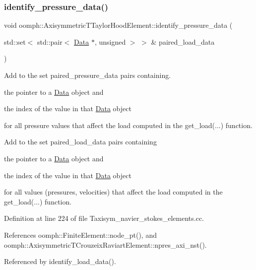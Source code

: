 \subsubsection{\texorpdfstring{identify\+\_\+pressure\+\_\+data()}{identify\_pressure\_data()}}
{\footnotesize\ttfamily void oomph\+::\+Axisymmetric\+T\+Taylor\+Hood\+Element\+::identify\+\_\+pressure\+\_\+data (\begin{DoxyParamCaption}\item[{std\+::set$<$ std\+::pair$<$ \hyperlink{classoomph_1_1Data}{Data} $\ast$, unsigned $>$ $>$ \&}]{paired\+\_\+load\+\_\+data }\end{DoxyParamCaption})}



Add to the set {\ttfamily paired\+\_\+pressure\+\_\+data} pairs containing. 


\begin{DoxyItemize}
\item the pointer to a \hyperlink{classoomph_1_1Data}{Data} object and
\item the index of the value in that \hyperlink{classoomph_1_1Data}{Data} object
\end{DoxyItemize}for all pressure values that affect the load computed in the {\ttfamily get\+\_\+load}(...) function.

Add to the set {\ttfamily paired\+\_\+load\+\_\+data} pairs containing
\begin{DoxyItemize}
\item the pointer to a \hyperlink{classoomph_1_1Data}{Data} object and
\item the index of the value in that \hyperlink{classoomph_1_1Data}{Data} object
\end{DoxyItemize}for all values (pressures, velocities) that affect the load computed in the {\ttfamily get\+\_\+load}(...) function. 

Definition at line 224 of file Taxisym\+\_\+navier\+\_\+stokes\+\_\+elements.\+cc.



References oomph\+::\+Finite\+Element\+::node\+\_\+pt(), and oomph\+::\+Axisymmetric\+T\+Crouzeix\+Raviart\+Element\+::npres\+\_\+axi\+\_\+nst().



Referenced by identify\+\_\+load\+\_\+data().

\mbox{\label{classoomph_1_1AxisymmetricTTaylorHoodElement_a5b492d4fc80759934938bd4c296f9237}} 
